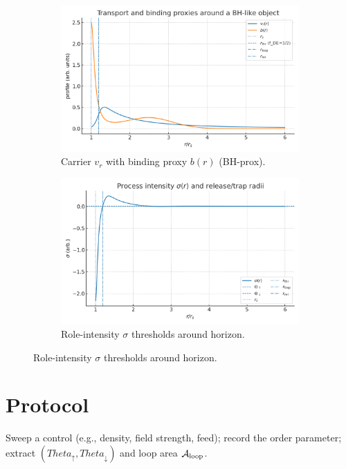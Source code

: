 \documentclass[12pt,a4paper,oneside]{scrreprt}
\def\Theta{Theta}%
\begin{document}
\begin{figure}[htbp]\centering
  \begin{subfigure}[t]{0.49\linewidth}
    \includegraphics[width=\linewidth]{bh_profiles_vr_b.png}
    \caption{Carrier $v_r$ with binding proxy $b(r)$ (BH-prox).}
    \label{fig:bh:profiles}
  \end{subfigure}\hfill
  \begin{subfigure}[t]{0.49\linewidth}
    \includegraphics[width=\linewidth]{bh_sigma_thresholds.png}
    \caption{Role-intensity $\sigma$ thresholds around horizon.}
    \label{fig:bh:sigma}
  \end{subfigure}
\end{figure}

\section*{Protocol}
Sweep a control (e.g., density, field strength, feed); record the order parameter; extract $(\Theta_\uparrow,\Theta_\downarrow)$ and loop area $\mathcal A_{\rm loop}$.
\end{document}
